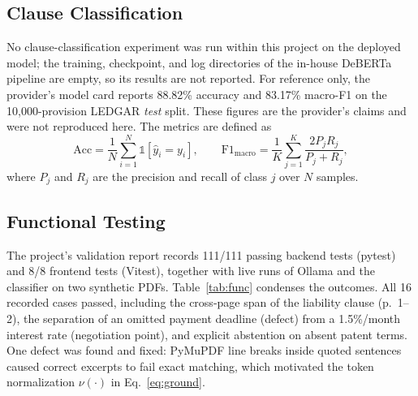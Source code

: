 \documentclass[conference]{IEEEtran}
\begin{document}
\subsection{Clause Classification}
No clause-classification experiment was run within this project on the deployed model; the training, checkpoint, and log directories of the in-house DeBERTa pipeline are empty, so its results are not reported. For reference only, the provider's model card reports 88.82\% accuracy and 83.17\% macro-F1 on the 10{,}000-provision LEDGAR \emph{test} split. These figures are the provider's claims and were not reproduced here. The metrics are defined as
\begin{equation}
\mathrm{Acc}=\frac{1}{N}\sum_{i=1}^{N}\mathbb{1}[\hat{y}_i=y_i],\qquad \mathrm{F1}_{\mathrm{macro}}=\frac{1}{K}\sum_{j=1}^{K}\frac{2P_jR_j}{P_j+R_j},
\end{equation}
where $P_j$ and $R_j$ are the precision and recall of class $j$ over $N$ samples.

\subsection{Functional Testing}
The project's validation report records 111/111 passing backend tests (pytest) and 8/8 frontend tests (Vitest), together with live runs of Ollama and the classifier on two synthetic PDFs. Table~\ref{tab:func} condenses the outcomes. All 16 recorded cases passed, including the cross-page span of the liability clause (p.~1--2), the separation of an omitted payment deadline (defect) from a 1.5\%/month interest rate (negotiation point), and explicit abstention on absent patent terms. One defect was found and fixed: PyMuPDF line breaks inside quoted sentences caused correct excerpts to fail exact matching, which motivated the token normalization $\nu(\cdot)$ in Eq.~\eqref{eq:ground}.
\end{document}
